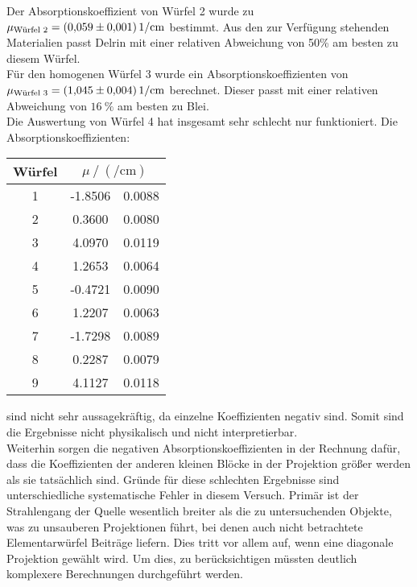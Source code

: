 \noindent Der Absorptionskoeffizient von Würfel 2 wurde zu $\mu_\t{Würfel 2} = \SI{0.059(0001)}{1\per\centi\metre}$ bestimmt.
Aus den zur Verfügung stehenden Materialien passt Delrin mit einer relativen Abweichung von 50\% am besten zu diesem Würfel.\\
\noindent
Für den homogenen Würfel 3 wurde ein Absorptionskoeffizienten von $\mu_\t{Würfel 3} = \SI{1.045(0004)}{1\per\centi\metre}$ berechnet.
Dieser passt mit einer relativen Abweichung von $\SI{16}{\percent}$ am besten zu Blei.\\
\noindent
Die Auswertung von Würfel 4 hat insgesamt sehr schlecht nur funktioniert. Die Absorptionskoeffizienten:
  \begin{table}[H]
    \centering
    \begin{tabular}{c S[table-format=3.4] @{${}\pm{}$} S[table-format=1.4] }
      \toprule
      {Würfel} &   \\
       & -1.8506& 0.0088 \\
      2 & 0.3600 & 0.0080 \\
      3 & 4.0970 & 0.0119 \\
      4 & 1.2653 & 0.0064 \\
      5 & -0.4721& 0.0090 \\
      6 & 1.2207 & 0.0063 \\
      7 & -1.7298& 0.0089 \\
      8 & 0.2287 & 0.0079 \\
      9 & 4.1127 & 0.0118 \\
      \bottomrule
    \end{tabular}
  \end{table} 
\noindent
sind nicht sehr aussagekräftig, da einzelne Koeffizienten negativ sind. Somit sind die Ergebnisse nicht physikalisch und nicht interpretierbar.\\
Weiterhin sorgen die negativen Absorptionskoeffizienten in der Rechnung dafür, dass die Koeffizienten der anderen kleinen Blöcke in der Projektion größer werden als sie tatsächlich sind.
Gründe für diese schlechten Ergebnisse sind unterschiedliche systematische Fehler in diesem Versuch.
Primär ist der Strahlengang der Quelle wesentlich breiter als die zu untersuchenden Objekte, 
was zu unsauberen Projektionen führt, bei denen auch nicht betrachtete Elementarwürfel Beiträge liefern.
Dies tritt vor allem auf, wenn eine diagonale Projektion gewählt wird. 
Um dies, zu berücksichtigen müssten deutlich komplexere Berechnungen durchgeführt werden.\\
